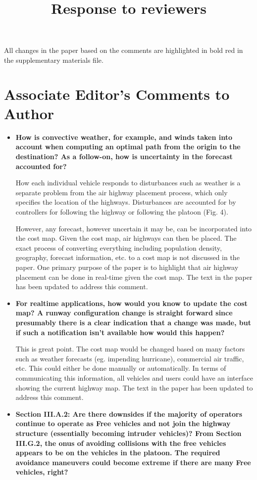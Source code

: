 \documentclass[submit]{aiaa-pretty}
\title{Response to reviewers}
\begin{document}
\maketitle

All changes in the paper based on the comments are highlighted in bold red in the supplementary materials file.

\section{Associate Editor's Comments to Author}
\begin{itemize}
\item\textbf{How is convective weather, for example, and winds taken into account when computing an optimal path from the origin to the destination?  As a follow-on, how is uncertainty in the forecast accounted for?}

How each individual vehicle responds to disturbances such as weather is a separate problem from the air highway placement process, which only specifies the location of the highways. Disturbances are accounted for by controllers for following the highway or following the platoon (Fig. 4). 

However, any forecast, however uncertain it may be, can be incorporated into the cost map. Given the cost map, air highways can then be placed. The exact process of converting everything including population density, geography, forecast information, etc. to a cost map is not discussed in the paper. One primary purpose of the paper is to highlight that air highway placement can be done in real-time given the cost map. The text in the paper has been updated to address this comment.

\item\textbf{For realtime applications, how would you know to update the cost map?  A runway configuration change is straight forward since presumably there is a clear indication that a change was made, but if such a notification isn’t available how would this happen?}

This is great point. The cost map would be changed based on many factors such as weather forecasts (eg. impending hurricane), commercial air traffic, etc. This could either be done manually or automatically. In terms of communicating this information, all vehicles and users could have an interface showing the current highway map. The text in the paper has been updated to address this comment.

\item\textbf{Section III.A.2: Are there downsides if the majority of operators continue to operate as Free vehicles and not join the highway structure (essentially becoming intruder vehicles)?  From Section III.G.2, the onus of avoiding collisions with the free vehicles appears to be on the vehicles in the platoon.  The required avoidance maneuvers could become extreme if there are many Free vehicles, right?}


\end{itemize}
\end{document}
